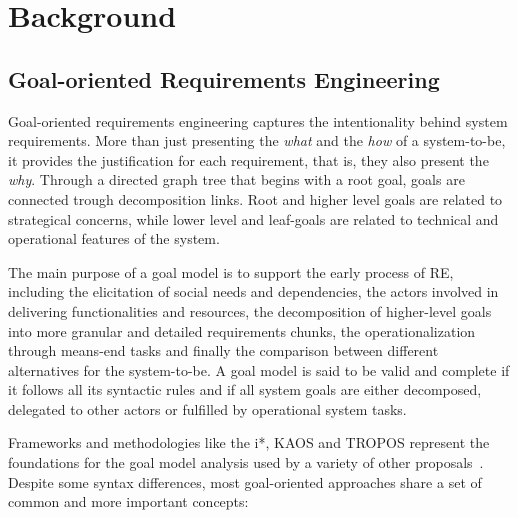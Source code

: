 \chapter{Background}\label{ch:baseline}%

\section{Goal-oriented Requirements Engineering}

Goal-oriented requirements engineering captures the intentionality behind system requirements. More than just presenting the \textit{what} and the \textit{how} of a system-to-be, it provides the justification for each requirement, that is, they also present the \textit{why}. Through a directed graph tree that begins with a root goal, goals are connected trough decomposition links. Root and higher level goals are related to strategical concerns, while lower level and leaf-goals are related to technical and operational features of the system. 

The main purpose of a goal model is to support the early process of RE, including the elicitation of social needs and dependencies, the actors involved in delivering functionalities and resources, the decomposition of higher-level goals into more granular and detailed requirements chunks, the operationalization through means-end tasks and finally the comparison between different alternatives for the system-to-be. A goal model is said to be valid and complete if it follows all its syntactic rules and if all system goals are either decomposed, delegated to other actors or fulfilled by operational system tasks. 

Frameworks and methodologies like the i*, KAOS and TROPOS represent the foundations for the goal model analysis used by a variety of other proposals~\cite{Yu1996, Dardenne1993, Bresciani:2004}. Despite some syntax differences, most goal-oriented approaches share a set of common and more important concepts:
\bigskip

